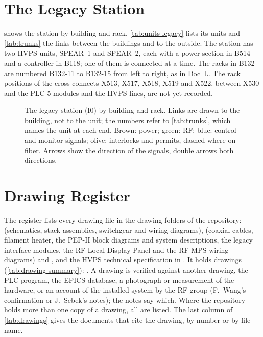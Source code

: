 \section{The Legacy Station}\label{sec:overview}

 shows the station by building and rack,
\cref{tab:units-legacy} lists its units and \cref{tab:trunks} the links between the
buildings and to the outside. The station has two HVPS units, SPEAR~1 and SPEAR~2,
each with a power section in B514 and a controller in B118; one of them is connected
at a time. The racks in B132 are numbered B132-11 to B132-15 from left to right, as in
Doc~L. The rack positions of the cross-connects X513, X517, X518, X519 and X522, between
X530 and the PLC-5 modules and the HVPS lines, are not yet recorded.

\begin{figure}[tbp]
\centering
\begin{fitpicture}

\end{fitpicture}
\caption[The legacy station by building and rack.]{The legacy station (I0) by building
and rack. Links are drawn to the building, not to the unit; the numbers refer to
\cref{tab:trunks}, which names the unit at each end. Brown: power; green: RF; blue:
control and monitor signals; olive: interlocks and permits, dashed where on fiber.
Arrows show the direction of the signals, double arrows both directions.}
\label{fig:station-overview}
\end{figure}





\section{Drawing Register}\label{sec:register}

The register lists every drawing file in the drawing folders of the repository:
 (schematics, stack assemblies, switchgear and wiring
diagrams),  (coaxial cables, filament heater, the PEP-II
block diagrams and system descriptions, the legacy interface modules, the RF Local
Display Panel and the RF MPS wiring diagrams) and , and the HVPS technical
specification in . It holds \WDrawings{}
drawings (\cref{tab:drawing-summary}): \WStatusList. A drawing is verified against
another drawing, the PLC program, the EPICS database, a photograph or measurement of
the hardware, or an account of the installed system by the RF group (F.~Wang's
confirmation or J.~Sebek's notes); the notes say which. Where the
repository holds more than one copy of a drawing, all are listed. The last column of
\cref{tab:drawings} gives the documents that cite the drawing, by number or by file
name.

